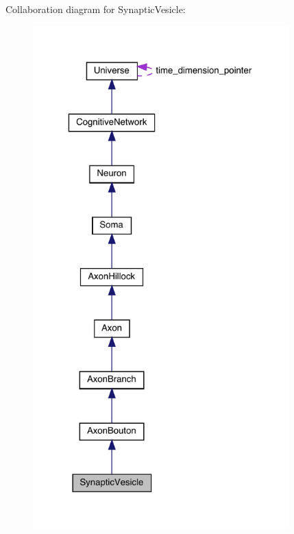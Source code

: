Collaboration diagram for Synaptic\+Vesicle\+:\nopagebreak
\begin{figure}[H]
\begin{center}
\leavevmode
\includegraphics[height=550pt]{class_synaptic_vesicle__coll__graph}
\end{center}
\end{figure}
